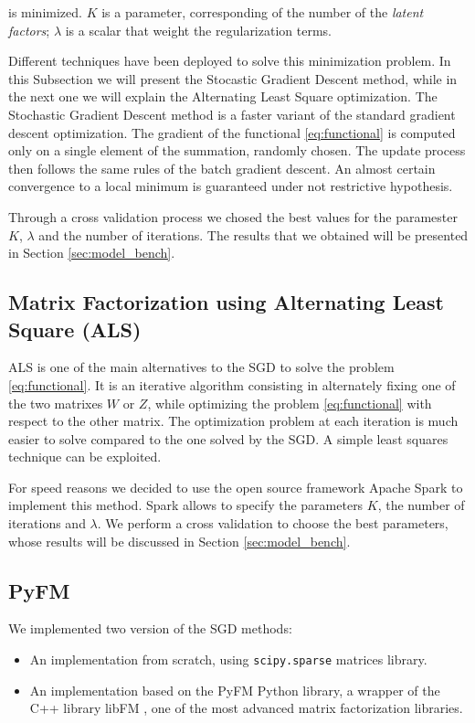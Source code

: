 \documentclass[10pt,conference,compsocconf]{IEEEtran}
\begin{document}
is minimized. $K$ is a parameter,
corresponding of the number of the \textit{latent factors}; $\lambda$ is a scalar 
that weight the regularization terms.

Different techniques have been deployed to solve this minimization problem. In this Subsection we
will present the Stocastic Gradient Descent method, while in the next one we will explain the
Alternating Least Square optimization. 
The Stochastic Gradient Descent method is a faster variant of the standard gradient descent
optimization. The gradient of the functional \ref{eq:functional} is computed only on a single
element of the summation, randomly chosen. The update process then follows the same rules of the batch
gradient descent.
An almost certain convergence to a local minimum is guaranteed under not restrictive hypothesis.

Through a cross validation process we chosed the best values for the paramester $K$, $\lambda$ and
the number of iterations. The results that we obtained will be presented in Section
\ref{sec:model_bench}.

\subsection{Matrix Factorization using Alternating Least Square (ALS)}
ALS is one of the main alternatives to the SGD to solve the problem \ref{eq:functional}.
It is an iterative algorithm consisting in alternately fixing one of the two matrixes $W$ or $Z$,
while optimizing the problem \ref{eq:functional} with respect to the other matrix.
The optimization problem at each iteration is much easier to solve compared to the one solved by the
SGD. A simple least squares technique can be exploited.

For speed reasons we decided to use the open source framework Apache Spark to implement this method.
Spark allows to specify the parameters $K$, the number of iterations and $\lambda$. We perform a
cross validation to choose the best parameters, whose results will be discussed in Section 
\ref{sec:model_bench}.

\subsection{PyFM}

We implemented two version of the SGD methods:
\begin{itemize}
\item An implementation from scratch, using \texttt{scipy.sparse} matrices library.
\item An implementation based on the PyFM Python library, a wrapper of the C++ library libFM
\cite{rendle:tist2012}, one of
the most advanced matrix factorization libraries.
\end{itemize}
\end{document}
